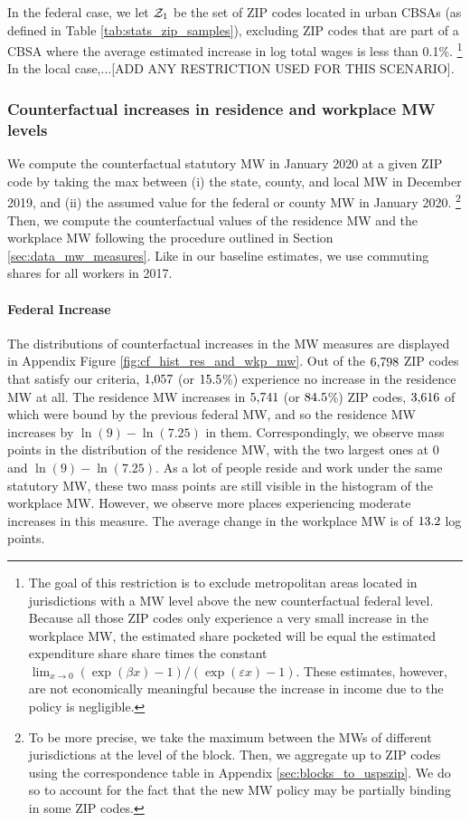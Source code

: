 In the federal case, we let $\mathcal{Z}_1$ be the set of ZIP codes located in urban 
CBSAs (as defined in Table \ref{tab:stats_zip_samples}), excluding ZIP codes 
that are part of a CBSA where the average estimated increase in log total wages 
is less than 0.1\%.%
\footnote{\label{foot:restriction_on_zipcodes}
The goal of this restriction is to exclude metropolitan areas located 
in jurisdictions with a MW level above the new counterfactual federal level.
Because all those ZIP codes only experience a very small increase in the 
workplace MW, the estimated share pocketed will be equal the estimated
expenditure share share times the constant 
$\lim_{x\to 0} \left(\exp(\beta x)-1\right)/\left(\exp(\varepsilon x)-1\right)$.
These estimates, however, are not economically meaningful because the increase
in income due to the policy is negligible.}
In the local case,...[ADD ANY RESTRICTION USED FOR THIS SCENARIO].

\subsubsection*{Counterfactual increases in residence and workplace MW levels}
\label{sec:cf_res_and_wkp_changes}

We compute the counterfactual statutory MW in January 2020 at a given ZIP code 
by taking the max between (i) the state, county, and local MW in December 2019, 
and (ii) the assumed value for the federal or county MW in January 2020.%
\footnote{To be more precise, we take the maximum between the MWs of different
jurisdictions at the level of the block.
Then, we aggregate up to ZIP codes using the correspondence table in Appendix 
\ref{sec:blocks_to_uspszip}.
We do so to account for the fact that the new MW policy may be partially 
binding in some ZIP codes.}
Then, we compute the counterfactual values of the residence MW and the workplace
MW following the procedure outlined in Section \ref{sec:data_mw_measures}.
Like in our baseline estimates, we use commuting shares for all workers in
2017.

\paragraph{Federal Increase}

The distributions of counterfactual increases in the MW measures are displayed 
in Appendix Figure \ref{fig:cf_hist_res_and_wkp_mw}.
Out of the $\textnormal{6,798}$ ZIP codes that satisfy our criteria, 
$\textnormal{1,057}$ (or $\textnormal{15.5}$\%) experience no increase in 
the residence MW at all.
The residence MW increases in $\textnormal{5,741}$ (or $\textnormal{84.5}$\%) ZIP 
codes, $\textnormal{3,616}$ of which were bound by the previous federal MW, and 
so the residence MW increases by $\ln(9)-\ln(7.25)$ in them.
Correspondingly, we observe mass points in the distribution of the residence MW,
with the two largest ones at $0$ and $\ln(9)-\ln(7.25)$.
As a lot of people reside and work under the same statutory MW, these two mass
points are still visible in the histogram of the workplace MW.
However, we observe more places experiencing moderate increases in this measure.
The average change in the workplace MW is of $\textnormal{13.2}$ log points.

